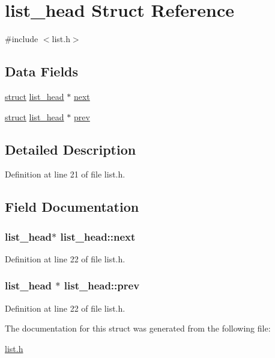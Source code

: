 \hypertarget{structlist__head}{}\section{list\+\_\+head Struct Reference}
\label{structlist__head}


{\ttfamily \#include $<$list.\+h$>$}

\subsection*{Data Fields}
\begin{DoxyCompactItemize}
\item 
\hyperlink{notes_8txt_aeb8c646dbe282a58600b038dd7f0fed2}{struct} \hyperlink{structlist__head}{list\+\_\+head} $\ast$ \hyperlink{structlist__head_ac3b0ff0dfb978a0cfbdad6b9d19cdcfe}{next}
\item 
\hyperlink{notes_8txt_aeb8c646dbe282a58600b038dd7f0fed2}{struct} \hyperlink{structlist__head}{list\+\_\+head} $\ast$ \hyperlink{structlist__head_aaa0eabda8877e1d6de73a33f223ad004}{prev}
\end{DoxyCompactItemize}


\subsection{Detailed Description}


Definition at line 21 of file list.\+h.



\subsection{Field Documentation}
\subsubsection[{\texorpdfstring{next}{next}}]{ {\bf list\+\_\+head}$\ast$ list\+\_\+head\+::next}\hypertarget{structlist__head_ac3b0ff0dfb978a0cfbdad6b9d19cdcfe}{}\label{structlist__head_ac3b0ff0dfb978a0cfbdad6b9d19cdcfe}


Definition at line 22 of file list.\+h.

\subsubsection[{\texorpdfstring{prev}{prev}}]{ {\bf list\+\_\+head} $\ast$ list\+\_\+head\+::prev}\hypertarget{structlist__head_aaa0eabda8877e1d6de73a33f223ad004}{}\label{structlist__head_aaa0eabda8877e1d6de73a33f223ad004}


Definition at line 22 of file list.\+h.



The documentation for this struct was generated from the following file\+:\begin{DoxyCompactItemize}
\item 
\hyperlink{list_8h}{list.\+h}\end{DoxyCompactItemize}
